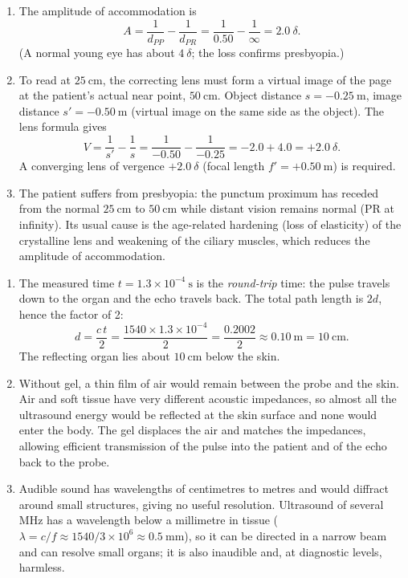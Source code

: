\documentclass[11pt]{article}
\newcommand{\cle}[1]{{\popxbold\color{popdark}#1}}
\begin{document}
\begin{corrige}
\begin{enumerate}
\item The amplitude of accommodation is
\[ A = \frac{1}{d_{PP}} - \frac{1}{d_{PR}} = \frac{1}{0.50} - \frac{1}{\infty} = 2.0\ \delta. \]
(A normal young eye has about $4\ \delta$; the loss confirms presbyopia.)
\item To read at $25\ \mathrm{cm}$, the correcting lens must form a virtual image of the page at the patient's actual near point, $50\ \mathrm{cm}$. Object distance $s = -0.25\ \mathrm{m}$, image distance $s' = -0.50\ \mathrm{m}$ (virtual image on the same side as the object). The lens formula gives
\[ V = \frac{1}{s'} - \frac{1}{s} = \frac{1}{-0.50} - \frac{1}{-0.25} = -2.0 + 4.0 = +2.0\ \delta. \]
A converging lens of vergence $+2.0\ \delta$ (focal length $f' = +0.50\ \mathrm{m}$) is required.
\item The patient suffers from \cle{presbyopia}: the punctum proximum has receded from the normal $25\ \mathrm{cm}$ to $50\ \mathrm{cm}$ while distant vision remains normal (PR at infinity). Its usual cause is the age-related hardening (loss of elasticity) of the crystalline lens and weakening of the ciliary muscles, which reduces the amplitude of accommodation.
\end{enumerate}
\end{corrige}

\begin{corrige}
\begin{enumerate}
\item The measured time $t = 1.3\times 10^{-4}\ \mathrm{s}$ is the \emph{round-trip} time: the pulse travels down to the organ and the echo travels back. The total path length is $2d$, hence the factor of 2:
\[ d = \frac{c\,t}{2} = \frac{1540 \times 1.3\times 10^{-4}}{2} = \frac{0.2002}{2} \approx 0.10\ \mathrm{m} = 10\ \mathrm{cm}. \]
The reflecting organ lies about $10\ \mathrm{cm}$ below the skin.
\item Without gel, a thin film of air would remain between the probe and the skin. Air and soft tissue have very different acoustic impedances, so almost all the ultrasound energy would be reflected at the skin surface and none would enter the body. The gel displaces the air and matches the impedances, allowing efficient transmission of the pulse into the patient and of the echo back to the probe.
\item Audible sound has wavelengths of centimetres to metres and would diffract around small structures, giving no useful resolution. Ultrasound of several $\mathrm{MHz}$ has a wavelength below a millimetre in tissue ($\lambda = c/f \approx 1540/3\times10^6 \approx 0.5\ \mathrm{mm}$), so it can be directed in a narrow beam and can resolve small organs; it is also inaudible and, at diagnostic levels, harmless.
\end{enumerate}
\end{corrige}
\end{document}
